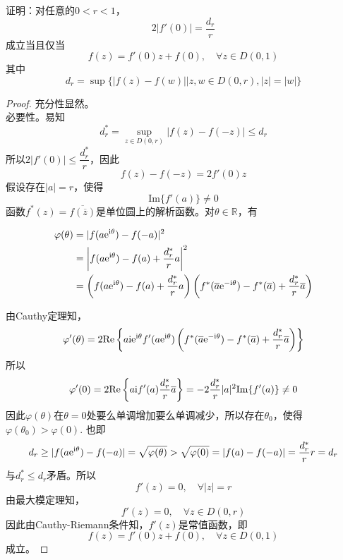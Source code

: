 \begin{theorem}\label{theorem:complex}

    证明：对任意的$0 < r < 1$，
    $$2|f'(0)| = \dfrac{d_r}{r}$$
    成立当且仅当
    $$f(z) = f'(0)z + f(0), \quad \forall z \in D(0,1)$$
    其中
    $$d_r = \sup\{|f(z) - f(w)|\big| z,w \in D(0,r), |z| = |w|\}$$
    
\end{theorem}

\begin{proof}
    
    充分性显然。\\
    必要性。易知
    $$d_r^{*} = \sup\limits_{z \in D(0,r)}{|f(z) - f(-z)|} \leq d_r$$
    所以$2|f'(0)| \leq \dfrac{d_r^{*}}{r}$，因此
    $$f(z) - f(-z) = 2f'(0)z$$
    假设存在$|a| = r$，使得
    $$\mathrm{Im}\{f'(a)\} \neq 0$$
    函数$f^{*}(z) = \overline{f(\overline{z})}$是单位圆上的解析函数。对$\theta \in \mathbb{R}$，有

    \begin{align*}
        \varphi(\theta) & = |f(a\mathrm{e}^{\mathrm{i} \theta}) - f(-a)|^2 \\
        & = \left|f(a\mathrm{e}^{\mathrm{i} \theta}) - f(a) + \dfrac{d_r^{*}}{r}a\right|^2 \\
        & = \left(f(a\mathrm{e}^{\mathrm{i} \theta}) - f(a) + \dfrac{d_r^{*}}{r}a\right) \left(f^{*}(\overline{a}\mathrm{e}^{-\mathrm{i} \theta}) - f^{*}(\overline{a}) + \dfrac{d_r^{*}}{r}\overline{a}\right)
    \end{align*}

    由\textup{Cauthy}定理知，
    $$\varphi'(\theta) = 2 \mathrm{Re}\left\{ a\mathrm{i} \mathrm{e}^{\mathrm{i} \theta}f'(a\mathrm{e}^{\mathrm{i} \theta}) \left( f^{*}(\overline{a}\mathrm{e}^{-\mathrm{i} \theta}) - f^{*}(\overline{a}) + \dfrac{d_r^{*}}{r}\overline{a} \right) \right\}$$
    所以
    $$\varphi'(0) = 2 \mathrm{Re}\left\{a\mathrm{i} f'(a)\dfrac{d_r^{*}}{r}\overline{a}\right\} = -2\dfrac{d_r^{*}}{r}|a|^2\mathrm{Im}\{f'(a)\} \neq 0$$
    因此$\varphi(\theta)$在$\theta = 0$处要么单调增加要么单调减少，所以存在$\theta_0$，使得$\varphi(\theta_0) > \varphi(0)$. 也即
    $$d_r \geq |f(a\mathrm{e}^{\mathrm{i} \theta}) - f(-a)| = \sqrt{\varphi(\theta)} > \sqrt{\varphi(0)} = |f(a) - f(-a)| = \dfrac{d_r^{*}}{r}r = d_r$$
    与$d_r^{*} \leq d_r$矛盾。所以
    $$f'(z) = 0, \quad \forall |z| = r$$
    由最大模定理知，
    $$f'(z) = 0, \quad \forall z \in D(0,r)$$
    因此由\textup{Cauthy-Riemann}条件知，$f'(z)$是常值函数，即
    $$f(z) = f'(0)z + f(0), \quad \forall z \in D(0,1)$$
    成立。
    
\end{proof}

